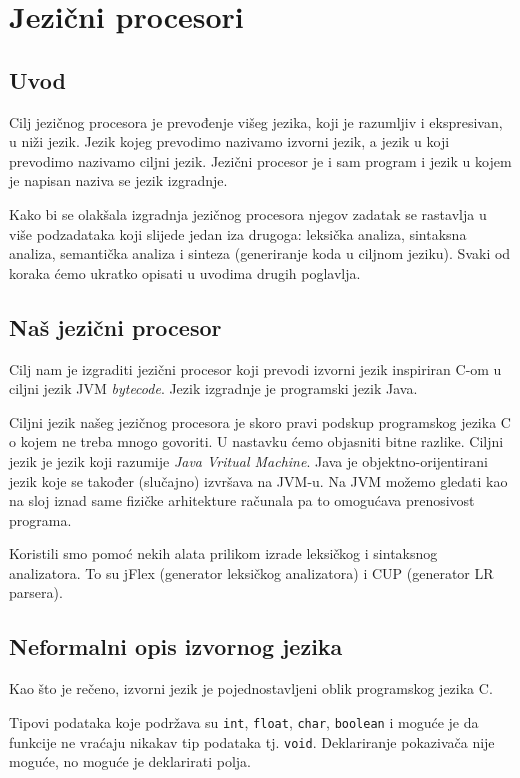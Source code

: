 \chapter{Jezični procesori}

\section{Uvod}

Cilj jezičnog procesora je prevođenje višeg jezika, koji je razumljiv i ekspresivan, u niži jezik. Jezik kojeg prevodimo nazivamo izvorni jezik, a jezik u koji prevodimo nazivamo ciljni jezik. Jezični procesor je i sam program i jezik u kojem je napisan naziva se jezik izgradnje.

Kako bi se olakšala izgradnja jezičnog procesora njegov zadatak se rastavlja u više podzadataka koji slijede jedan iza drugoga: leksička analiza, sintaksna analiza, semantička analiza i sinteza (generiranje koda u ciljnom jeziku). Svaki od koraka ćemo ukratko opisati u uvodima drugih poglavlja.

\section{Naš jezični procesor}

Cilj nam je izgraditi jezični procesor koji prevodi izvorni jezik inspiriran C-om u ciljni jezik JVM \emph{bytecode}. Jezik izgradnje je programski jezik Java.

Ciljni jezik našeg jezičnog procesora je skoro pravi podskup programskog jezika C o kojem ne treba mnogo govoriti. 
U nastavku ćemo objasniti bitne razlike. Ciljni jezik je jezik koji razumije \emph{Java Vritual Machine}. Java je objektno-orijentirani jezik koje se također (slučajno) izvršava na JVM-u. Na JVM možemo gledati kao na sloj iznad same fizičke arhitekture računala pa to omogućava prenosivost programa.

Koristili smo pomoć nekih alata prilikom izrade leksičkog i sintaksnog analizatora. To su jFlex (generator leksičkog analizatora) i CUP (generator LR parsera).

\section{Neformalni opis izvornog jezika}

Kao što je rečeno, izvorni jezik je pojednostavljeni oblik programskog jezika C.

Tipovi podataka koje podržava su \texttt{int}, \texttt{float}, \texttt{char}, \texttt{boolean} i moguće je da 
funkcije ne vraćaju nikakav tip podataka tj. \texttt{void}. Deklariranje pokazivača nije moguće, no moguće je deklarirati
polja.

